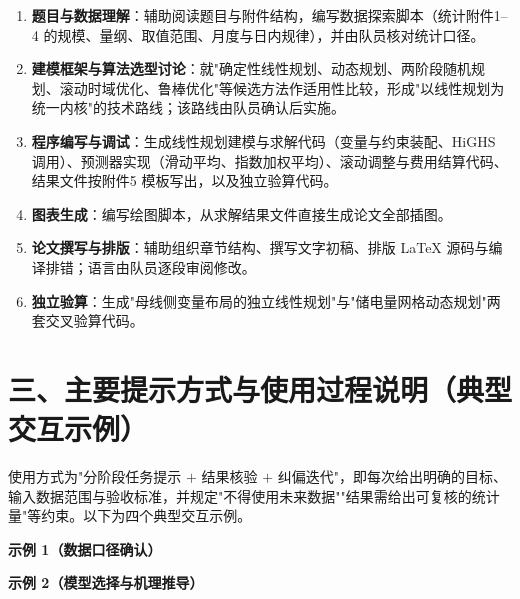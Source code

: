 \documentclass[12pt,a4paper]{ctexart}
\begin{document}
\begin{enumerate}[label=(\arabic*),leftmargin=2.2em,itemsep=2pt]
  \item \textbf{题目与数据理解}：辅助阅读题目与附件结构，编写数据探索脚本（统计附件1--4 的规模、量纲、取值范围、月度与日内规律），并由队员核对统计口径。
  \item \textbf{建模框架与算法选型讨论}：就"确定性线性规划、动态规划、两阶段随机规划、滚动时域优化、鲁棒优化"等候选方法作适用性比较，形成"以线性规划为统一内核"的技术路线；该路线由队员确认后实施。
  \item \textbf{程序编写与调试}：生成线性规划建模与求解代码（变量与约束装配、HiGHS 调用）、预测器实现（滑动平均、指数加权平均）、滚动调整与费用结算代码、结果文件按附件5 模板写出，以及独立验算代码。
  \item \textbf{图表生成}：编写绘图脚本，从求解结果文件直接生成论文全部插图。
  \item \textbf{论文撰写与排版}：辅助组织章节结构、撰写文字初稿、排版 LaTeX 源码与编译排错；语言由队员逐段审阅修改。
  \item \textbf{独立验算}：生成"母线侧变量布局的独立线性规划"与"储电量网格动态规划"两套交叉验算代码。
\end{enumerate}

\section*{三、主要提示方式与使用过程说明（典型交互示例）}

使用方式为"分阶段任务提示 $+$ 结果核验 $+$ 纠偏迭代"，即每次给出明确的目标、输入数据范围与验收标准，并规定"不得使用未来数据""结果需给出可复核的统计量"等约束。以下为四个典型交互示例。

\textbf{示例 1（数据口径确认）}

\noindent{}

\textbf{示例 2（模型选择与机理推导）}
\end{document}

